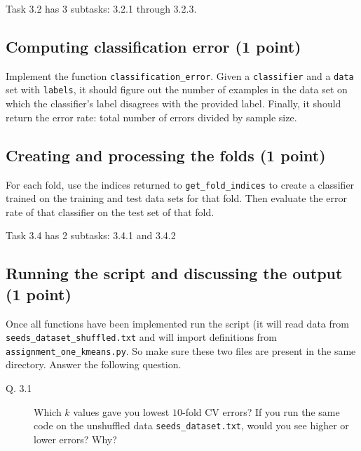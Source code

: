 \documentclass{article}
\begin{document}
Task 3.2 has 3 subtasks: 3.2.1 through 3.2.3.

\subsection{Computing classification error (1 point)}

Implement the function {\tt classification\_error}. Given a {\tt classifier} and a {\tt data} set with {\tt labels}, it should figure out the number of examples in the data set on
which the classifier's label disagrees with the provided label. Finally, it should return the error rate: total number of errors divided by sample size.

\subsection{Creating and processing the folds (1 point)}

For each fold, use the indices returned to {\tt get\_fold\_indices} to create a classifier trained on the training and test data sets for that fold. Then
evaluate the error rate of that classifier on the test set of that fold.

Task 3.4 has 2 subtasks: 3.4.1 and 3.4.2

\subsection{Running the script and discussing the output (1 point)}

Once all functions have been implemented run the script (it will read data from {\tt seeds\_dataset\_shuffled.txt} and will import definitions from {\tt assignment\_one\_kmeans.py}. So
make sure these two files are present in the same directory. Answer the following question.

\begin{description}
\item[Q. 3.1]
Which $k$ values gave you lowest $10$-fold CV errors? If you run the same code on the unshuffled data {\tt seeds\_dataset.txt}, would you see higher or lower errors?
Why?
\end{description}
\end{document}
